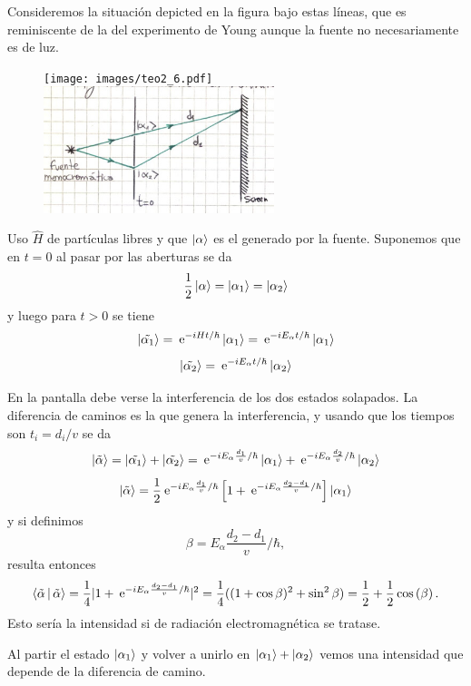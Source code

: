 \documentclass[10pt,oneside]{CBFT_book}
\begin{document}
Consideremos la situación depicted en la figura bajo estas líneas, que es reminiscente de la del
experimento de Young aunque la fuente no necesariamente es de luz.

\begin{figure}[h]
	\begin{center}
	\texttt{[image: images/teo2\_6.pdf]}
	\includegraphics[width=0.6\textwidth]{images/fig_ft2_young_analogous.jpg}
	\end{center}
	\caption{}
\end{figure} 

Uso $\hat{H}$ de partículas libres y que $\Ket{\alpha}$ es el generado por la fuente.
Suponemos que en $t=0$ al pasar por las aberturas se da
\[
	\frac{1}{2} \Ket{\alpha} = \Ket{\alpha_1} = \Ket{\alpha_2}
\]
y luego para $t>0$ se tiene 
\[
	\Ket{\tilde{\alpha_1}} = \:\mathrm{e}^{ -i H t /\hbar } \Ket{\alpha_1} =
		\:\mathrm{e}^{ -i E_\alpha t /\hbar } \Ket{\alpha_1}	
\]
\[
	\Ket{\tilde{\alpha_2}} = \:\mathrm{e}^{ -i E_\alpha t /\hbar } \Ket{\alpha_2}	
\]

En la pantalla debe verse la interferencia de los dos estados solapados. La diferencia de caminos
es la que genera la interferencia, y usando que los tiempos son $t_i = d_i/v$ se da
\[
	\Ket{\tilde{\alpha}} = \Ket{\tilde{\alpha_1}} + \Ket{\tilde{\alpha_2}} =
		\:\mathrm{e}^{ -i E_\alpha \frac{d_1}{v} /\hbar } \Ket{\alpha_1} +
		\:\mathrm{e}^{ -i E_\alpha \frac{d_2}{v} /\hbar } \Ket{\alpha_2}	
\]
\[
	\Ket{\tilde{\alpha}} = \frac{1}{2} \:\mathrm{e}^{ -i E_\alpha \frac{d_1}{v} /\hbar } 
		\left[ 1 + \:\mathrm{e}^{ -i E_\alpha \frac{d_2-d_1}{v} /\hbar } \right] \Ket{\alpha_1}
\]
y si definimos
\[
	\beta=E_\alpha \frac{d_2-d_1}{v} /\hbar,
\]
resulta entonces
\[
	\Braket{\tilde{\alpha}|\tilde{\alpha}} = 
	\frac{1}{4}| 1 +  \:\mathrm{e}^{ -i E_\alpha \frac{d_2-d_1}{v} /\hbar } |^2 =
		\frac{1}{4}( (1+\cos\beta)^2 + \sin^2\beta ) =
			\frac{1}{2} + \frac{1}{2}\cos\left( \beta \right).
\]
Esto sería la intensidad si de radiación electromagnética se tratase.

Al partir el estado $\Ket{\alpha_1} $ y volver a unirlo en $\Ket{\alpha_1} + \Ket{\alpha_2}$ vemos una 
intensidad que depende de la diferencia de camino.
\end{document}
